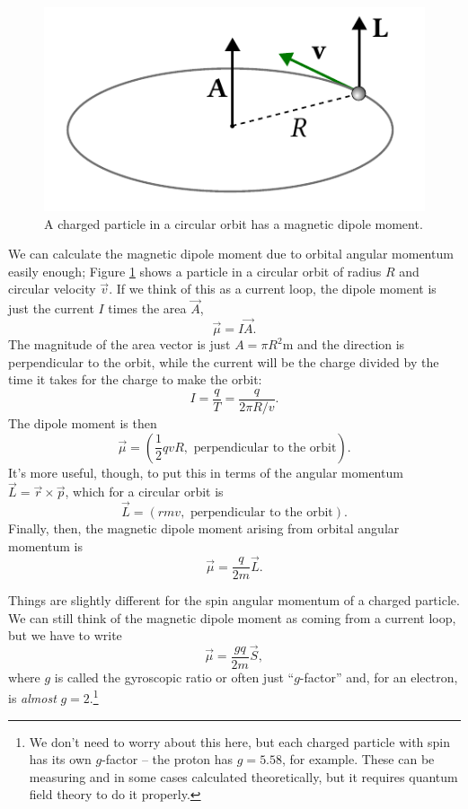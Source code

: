 \begin{figure}
\centering\includegraphics[width=0.5\linewidth]{Figures/Chapter 1/fig_circular_orbit.pdf}
\caption{A charged particle in a circular orbit has a magnetic dipole moment.}
\label{fig_circular_orbit}
\end{figure}

We can calculate the magnetic dipole moment due to orbital angular momentum easily enough; Figure \ref{fig_circular_orbit} shows a particle in a circular orbit of radius $R$ and circular velocity $\vec{v}$.  If we think of this as a current loop, the dipole moment is just the current $I$ times the area $\vec{A}$,
\[
\vec{\mu} = I\vec{A}.
\]
The magnitude of the area vector is just $A = \pi R^2$m and the direction is perpendicular to the orbit, while the current will be the charge divided by the time it takes for the charge to make the orbit:
\[
I = \frac{q}{T} = \frac{q}{2\pi R / v}.
\]
The dipole moment is then
\[
\vec{\mu} = \left( \frac{1}{2} qvR, \text{ perpendicular to the orbit} \right).
\]
It's more useful, though, to put this in terms of the angular momentum $\vec{L} = \vec{r} \times \vec{p}$, which for a circular orbit is
\[
\vec{L} = \left( rmv, \text{ perpendicular to the orbit} \right).
\]
Finally, then, the magnetic dipole moment arising from orbital angular momentum is 
\begin{equation}
\vec{\mu} = \frac{q}{2m} \vec{L}.
\end{equation}

Things are slightly different for the spin angular momentum of a charged particle.  We can still think of the magnetic dipole moment as coming from a current loop, but we have to write 
\begin{equation}
\vec{\mu} = \frac{gq}{2m} \vec{S},
\end{equation}
where $g$ is called the gyroscopic ratio or often just ``$g$-factor'' and, for an electron, is \emph{almost} $g = 2$.\footnote{We don't need to worry about this here, but each charged particle with spin has its own $g$-factor -- the proton has $g = 5.58$, for example.  These can be measuring and in some cases calculated theoretically, but it requires quantum field theory to do it properly.}

